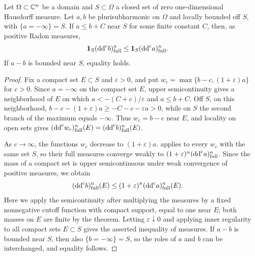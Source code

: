 \begin{lemma}\label{lem:small-pole-residual-invariance}
Let $\Omega\subset\mathbb C^n$ be a domain and $S\subset\Omega$ a closed set of zero one-dimensional Hausdorff measure. Let $a,b$ be plurisubharmonic on $\Omega$ and locally bounded off $S$, with $\{a=-\infty\}=S$. If $a\leq b+C$ near $S$ for some finite constant $C$, then, as positive Radon measures,
\[
 \mathbf1_S(\mathrm{dd}^{\mathrm{c}} b)^n_{\mathrm{full}}
       \leq\mathbf1_S(\mathrm{dd}^{\mathrm{c}} a)^n_{\mathrm{full}}.
\]
If $a-b$ is bounded near $S$, equality holds.
\end{lemma}
\begin{proof}
Fix a compact set $E\subset S$ and $\varepsilon>0$, and put
$w_c=\max\{b-c,(1+\varepsilon)a\}$ for $c>0$.
Since $a=-\infty$ on the compact set $E$, upper semicontinuity gives a neighborhood of $E$ on which $a<-(C+c)/\varepsilon$ and $a\leq b+C$. Off $S$, on this neighborhood,
$b-c-(1+\varepsilon)a\geq-C-c-\varepsilon a>0$,
while on $S$ the second branch of the maximum equals $-\infty$. Thus $w_c=b-c$ near $E$, and locality on open sets gives
$(\mathrm{dd}^{\mathrm{c}} w_c)^n_{\mathrm{full}}(E)=(\mathrm{dd}^{\mathrm{c}} b)^n_{\mathrm{full}}(E)$.

As $c\to\infty$, the functions $w_c$ decrease to $(1+\varepsilon)a$.  applies to every $w_c$ with the same set $S$, so their full measures converge weakly to $(1+\varepsilon)^n(\mathrm{dd}^{\mathrm{c}} a)^n_{\mathrm{full}}$. Since the mass of a compact set is upper semicontinuous under weak convergence of positive measures, we obtain
\[
 (\mathrm{dd}^{\mathrm{c}} b)^n_{\mathrm{full}}(E)
       \leq(1+\varepsilon)^n(\mathrm{dd}^{\mathrm{c}} a)^n_{\mathrm{full}}(E).
\]
Here we apply the semicontinuity after multiplying the measures by a fixed nonnegative cutoff function with compact support, equal to one near $E$; both masses on $E$ are finite by the theorem. Letting $\varepsilon\downarrow0$ and applying inner regularity to all compact sets $E\subset S$ gives the asserted inequality of measures. If $a-b$ is bounded near $S$, then also $\{b=-\infty\}=S$, so the roles of $a$ and $b$ can be interchanged, and equality follows.
\end{proof}










